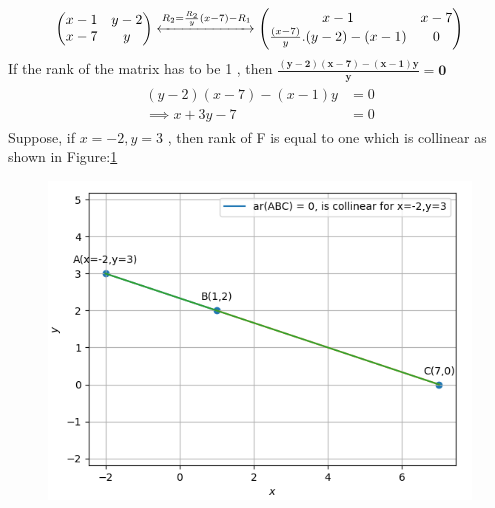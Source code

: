 \documentclass[12pt]{article}
\newcommand{\myvec}[1]{\ensuremath{\begin{pmatrix}#1\end{pmatrix}}}
\let\vec\mathbf
\begin{document}
\begin{align}
\label{eq:chem_balance_mat_row}
\myvec{
x-1 & y-2
\\
x-7 & y
}
	\xleftrightarrow[]{R_2 = \frac{R_2}{y}(x-7)-R_1}
\myvec{
x-1 & x-7
\\
	\frac{(x-7)}{y}.(y-2)-(x-1) & 0
}
\end{align}
If the rank of the matrix has to be 1 , then $\vec{\frac{(y-2)(x-7)-(x-1)y}{y}=0}$
\begin{align}
\begin{split}
	(y-2)(x-7)-(x-1)y &=0
\\
\implies x+3y-7 &=0 
\end{split}
\end{align}
Suppose, if $x=-2,y=3$ , then rank of F is equal to one which is collinear as shown in Figure:\ref    {fig:Fig}
\begin{figure}[!h]
	\begin{center} 
	    \includegraphics[width=\columnwidth]{./figs/sc1.png}
	\end{center}
\caption{}
\label{fig:Fig}
\end{figure}
\end{document}
